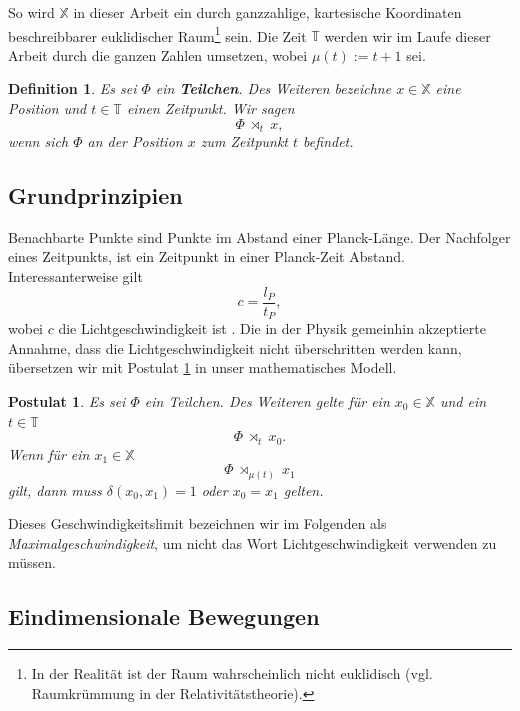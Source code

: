 \documentclass[a4paper,12pt,ngerman]{scrartcl}
\theoremstyle{plain}
\newtheorem{definition}{Definition}
\theoremstyle{plain}
\theoremstyle{plain}
\newtheorem{postulate}{Postulat}
\theoremstyle{plain}
\newcommand{\T}{\mathbb{T}}
\newcommand{\X}{\mathbb{X}}
\newcommand{\at}[1]{\;\rtimes_{#1}\;}
\begin{document}
So wird $\X$ in dieser Arbeit ein durch ganzzahlige, kartesische Koordinaten beschreibbarer euklidischer Raum\footnote{In der Realität ist der Raum wahrscheinlich nicht euklidisch (vgl. Raumkrümmung in der Relativitätstheorie).} sein. Die Zeit $\T$ werden wir im Laufe dieser Arbeit durch die ganzen Zahlen umsetzen, wobei $\mu(t):=t+1$ sei.



{
\begin{definition}
Es sei $\Phi$ ein \textbf{Teilchen}. Des Weiteren bezeichne $x\in\X$ eine Position und $t\in\T$ einen Zeitpunkt. Wir sagen
\[\Phi \at{t} x,\]
wenn sich $\Phi$ an der Position $x$ zum Zeitpunkt $t$ befindet.
\end{definition}
}

\subsection{Grundprinzipien}

Benachbarte Punkte sind Punkte im Abstand einer Planck-Länge. %
Der Nachfolger eines Zeitpunkts, ist ein Zeitpunkt in einer Planck-Zeit Abstand. Interessanterweise gilt
\[c=\frac{l_P}{t_P},\]
wobei $c$ die Lichtgeschwindigkeit ist \cite{history}. Die in der Physik gemeinhin akzeptierte Annahme, dass die Lichtgeschwindigkeit nicht überschritten werden kann, übersetzen wir mit Postulat \ref{pos_lightspeed} in unser mathematisches Modell.

{
\begin{postulate}\label{pos_lightspeed}
Es sei $\Phi$ ein Teilchen. Des Weiteren gelte für ein $x_0\in\X$ und ein $t\in\T$
\[\Phi \at{t} x_0.\]
Wenn für ein $x_1\in\X$ 
\[\Phi \at{\mu(t)} x_1\]
gilt, dann muss $\delta(x_0,x_1)=1$ oder $x_0=x_1$ gelten.
\end{postulate}
}

Dieses Geschwindigkeitslimit bezeichnen wir im Folgenden als \textit{Maximalgeschwindigkeit}, um nicht das Wort Lichtgeschwindigkeit verwenden zu müssen.

\subsection{Eindimensionale Bewegungen}
\end{document}

